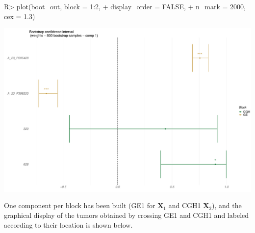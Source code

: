 \documentclass[
]{jss}
\begin{document}
\begin{CodeChunk}
\begin{CodeInput}
R> plot(boot_out, block = 1:2, 
+      display_order = FALSE, 
+      n_mark = 2000, cex = 1.3)
\end{CodeInput}


\begin{center}\includegraphics{RGCCA_vignette_files/figure-latex/unnamed-chunk-52-1} \end{center}

\end{CodeChunk}

\normalsize

One component per block has been built (GE1 for \(\mathbf{X}_1\) and
CGH1 \(\mathbf{X}_2\)), and the graphical display of the tumors obtained
by crossing GE1 and CGH1 and labeled according to their location is
shown below.

\footnotesize
\end{document}
